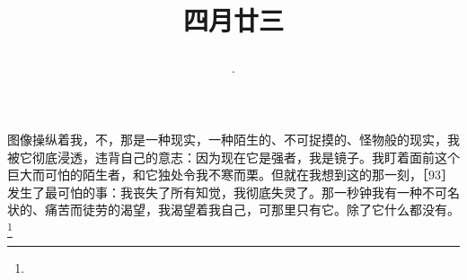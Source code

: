 \title{\date[d=30,m=5,y=2024][year:cn-y,年,month:cn,day:cn,日,·,weekday]·四月廿三 }
图像操纵着我，不，那是一种现实，一种陌生的、不可捉摸的、怪物般的现实，我被它彻底浸透，违背自己的意志：因为现在它是强者，我是镜子。我盯着面前这个巨大而可怕的陌生者，和它独处令我不寒而栗。但就在我想到这的那一刻，［93］发生了最可怕的事：我丧失了所有知觉，我彻底失灵了。那一秒钟我有一种不可名状的、痛苦而徒劳的渴望，我渴望着我自己，可那里只有它。除了它什么都没有。\footnote{ }

